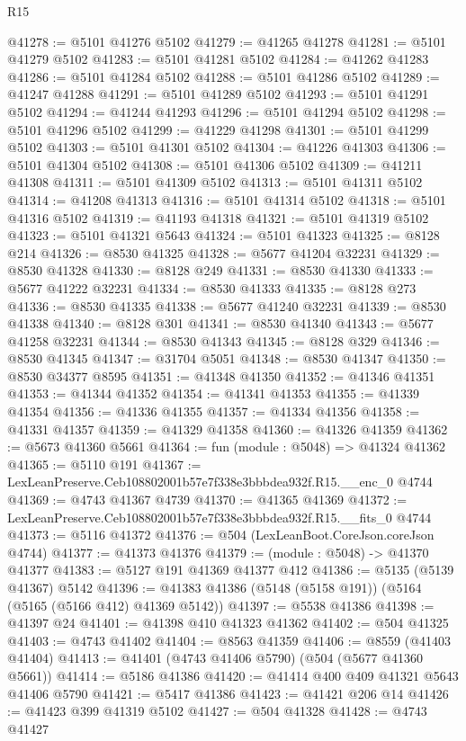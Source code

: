 \begin{lexlean}{R15}
\begin{coremodule}
{{{{{{{{{{{@41278 := @5101 @41276 @5102
@41279 := @41265 @41278
@41281 := @5101 @41279 @5102
@41283 := @5101 @41281 @5102
@41284 := @41262 @41283
@41286 := @5101 @41284 @5102
@41288 := @5101 @41286 @5102
@41289 := @41247 @41288
@41291 := @5101 @41289 @5102
@41293 := @5101 @41291 @5102
@41294 := @41244 @41293
@41296 := @5101 @41294 @5102
@41298 := @5101 @41296 @5102
@41299 := @41229 @41298
@41301 := @5101 @41299 @5102
@41303 := @5101 @41301 @5102
@41304 := @41226 @41303
@41306 := @5101 @41304 @5102
@41308 := @5101 @41306 @5102
@41309 := @41211 @41308
@41311 := @5101 @41309 @5102
@41313 := @5101 @41311 @5102
@41314 := @41208 @41313
@41316 := @5101 @41314 @5102
@41318 := @5101 @41316 @5102
@41319 := @41193 @41318
@41321 := @5101 @41319 @5102
@41323 := @5101 @41321 @5643
@41324 := @5101 @41323
@41325 := @8128 @214
@41326 := @8530 @41325
@41328 := @5677 @41204 @32231
@41329 := @8530 @41328
@41330 := @8128 @249
@41331 := @8530 @41330
@41333 := @5677 @41222 @32231
@41334 := @8530 @41333
@41335 := @8128 @273
@41336 := @8530 @41335
@41338 := @5677 @41240 @32231
@41339 := @8530 @41338
@41340 := @8128 @301
@41341 := @8530 @41340
@41343 := @5677 @41258 @32231
@41344 := @8530 @41343
@41345 := @8128 @329
@41346 := @8530 @41345
@41347 := @31704 @5051
@41348 := @8530 @41347
@41350 := @8530 @34377 @8595
@41351 := @41348 @41350
@41352 := @41346 @41351
@41353 := @41344 @41352
@41354 := @41341 @41353
@41355 := @41339 @41354
@41356 := @41336 @41355
@41357 := @41334 @41356
@41358 := @41331 @41357
@41359 := @41329 @41358
@41360 := @41326 @41359
@41362 := @5673 @41360 @5661
@41364 := fun (module : @5048) => @41324 @41362
@41365 := @5110 @191
@41367 := LexLeanPreserve.Ceb108802001b57e7f338e3bbbdea932f.R15.__enc_0 @4744
@41369 := @4743 @41367 @4739
@41370 := @41365 @41369
@41372 := LexLeanPreserve.Ceb108802001b57e7f338e3bbbdea932f.R15.__fits_0 @4744
@41373 := @5116 @41372
@41376 := @504 (LexLeanBoot.CoreJson.coreJson @4744)
@41377 := @41373 @41376
@41379 := (module : @5048) -> @41370 @41377
@41383 := @5127 @191 @41369 @41377 @412
@41386 := @5135 (@5139 @41367) @5142
@41396 := @41383 @41386 (@5148 (@5158 @191)) (@5164 (@5165 (@5166 @412) @41369 @5142))
@41397 := @5538 @41386
@41398 := @41397 @24
@41401 := @41398 @410 @41323 @41362
@41402 := @504 @41325
@41403 := @4743 @41402
@41404 := @8563 @41359
@41406 := @8559 (@41403 @41404)
@41413 := @41401 (@4743 @41406 @5790) (@504 (@5677 @41360 @5661))
@41414 := @5186 @41386
@41420 := @41414 @400 @409 @41321 @5643 @41406 @5790
@41421 := @5417 @41386
@41423 := @41421 @206 @14
@41426 := @41423 @399 @41319 @5102
@41427 := @504 @41328
@41428 := @4743 @41427
}}}}}}}}}}}
\end{coremodule}
\end{lexlean}
